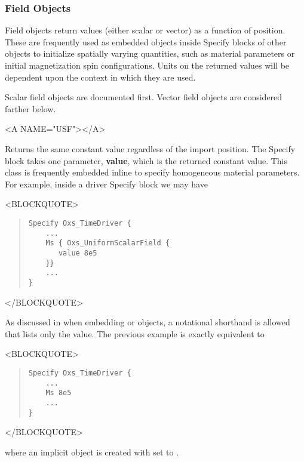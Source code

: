 \subsubsection{Field Objects\label{sec:oxsFieldObjects}}
Field objects return values (either scalar or vector) as a function of
position.  These are frequently used as embedded objects inside Specify
blocks of other  objects to initialize spatially varying
quantities, such as material parameters or initial magnetization spin
configurations.  Units on the returned values will be dependent upon the
context in which they are used.

Scalar field objects are documented first.  Vector field objects are
considered farther below.
\begin{description}
\begin{rawhtml}<A NAME="USF"></A>\end{rawhtml}%
%
\item[Oxs\_UniformScalarField:\label{item:UniformScalarField}]
   Returns the same constant value regardless of the import position.
   The Specify block takes one parameter, \textbf{value}, which is the
   returned constant value.  This class is frequently embedded inline to
   specify homogeneous material parameters.  For example, inside a driver
   Specify block we may have
\begin{rawhtml}<BLOCKQUOTE>\end{rawhtml}
\begin{quote}
\begin{verbatim}
Specify Oxs_TimeDriver {
    ...
    Ms { Oxs_UniformScalarField {
       value 8e5
    }}
    ...
}
\end{verbatim}
\end{quote}
\begin{rawhtml}</BLOCKQUOTE>\end{rawhtml}
As discussed in
when embedding 
or 
objects, a notational shorthand is allowed that lists only the value.
The previous example is exactly equivalent to
\begin{rawhtml}<BLOCKQUOTE>\end{rawhtml}
\begin{quote}
\begin{verbatim}
Specify Oxs_TimeDriver {
    ...
    Ms 8e5
    ...
}
\end{verbatim}
\end{quote}
\begin{rawhtml}</BLOCKQUOTE>\end{rawhtml}
where an implicit  object is
created with  set to .


\end{description}
